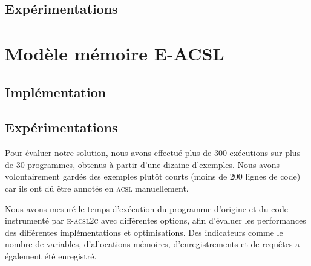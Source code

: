 \documentclass[french]{spimufcphdthesis}
\begin{document}
\section{Expérimentations}


\chapter{Modèle mémoire E-ACSL}


\section{Implémentation}


\section{Expérimentations}


Pour évaluer notre solution, nous avons effectué plus de 300 exécutions sur
plus de 30 programmes, obtenus à partir d'une dizaine d'exemples. Nous avons
volontairement gardés des exemples plutôt courts (moins de 200 lignes de code)
car ils ont dû être annotés en \textsc{acsl} manuellement.

Nous avons mesuré le temps d'exécution du programme d'origine et du code
instrumenté par \textsc{e-acsl2c} avec différentes options, afin d'évaluer les
performances des différentes implémentations et optimisations. Des indicateurs
comme le nombre de variables, d'allocations mémoires, d'enregistrements et de
requêtes a également été enregistré.
\end{document}
